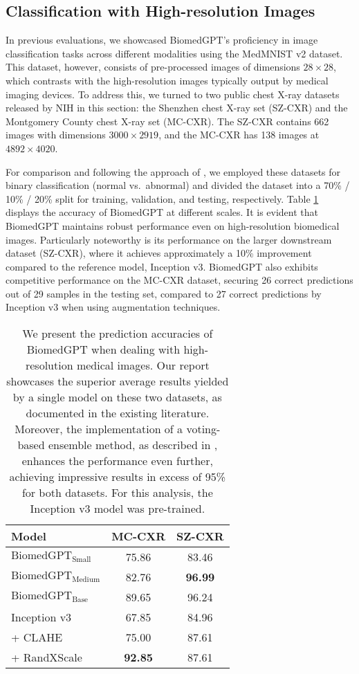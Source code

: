 \documentclass[10pt]{article} \usepackage[preprint]{tmlr}
\begin{document}
\subsection{Classification with High-resolution Images}
In previous evaluations, we showcased BiomedGPT's proficiency in image classification tasks across different modalities using the MedMNIST v2 dataset. This dataset, however, consists of pre-processed images of dimensions $28 \times 28$, which contrasts with the high-resolution images typically output by medical imaging devices. To address this, we turned to two public chest X-ray datasets released by NIH \citep{jaeger2014two} in this section: the Shenzhen chest X-ray set (SZ-CXR) and the Montgomery County chest X-ray set (MC-CXR). The SZ-CXR contains 662 images with dimensions $3000 \times 2919$, and the MC-CXR has 138 images at $4892 \times 4020$.

For comparison and following the approach of \citep{tasci2021voting}, we employed these datasets for binary classification (normal vs.\ abnormal) and divided the dataset into a 70\% / 10\% / 20\% split for training, validation, and testing, respectively. Table \ref{tab:high_resolution} displays the accuracy of BiomedGPT at different scales. It is evident that BiomedGPT maintains robust performance even on high-resolution biomedical images. Particularly noteworthy is its performance on the larger downstream dataset (SZ-CXR), where it achieves approximately a 10\% improvement compared to the reference model, Inception v3. BiomedGPT also exhibits competitive performance on the MC-CXR dataset, securing 26 correct predictions out of 29 samples in the testing set, compared to 27 correct predictions by Inception v3 when using augmentation techniques.

\begin{table}[htbp]
\centering
\caption{We present the prediction accuracies of BiomedGPT when dealing with high-resolution medical images. Our report showcases the superior average results yielded by a single model on these two datasets, as documented in the existing literature. Moreover, the implementation of a voting-based ensemble method, as described in \citep{tasci2021voting}, enhances the performance even further, achieving impressive results in excess of 95\% for both datasets. For this analysis, the Inception v3 model was pre-trained.}\label{tab:high_resolution} 
\begin{tabular}{lcc}
\toprule
Model & MC-CXR & SZ-CXR \\ \midrule
$\text{BiomedGPT}_{\text{Small}}$ & 75.86 & 83.46 \\
$\text{BiomedGPT}_{\text{Medium}}$ & 82.76 & \textbf{96.99} \\
$\text{BiomedGPT}_{\text{Base}}$ & 89.65 & 96.24 \\
Inception v3 \citep{szegedy2016rethinking} & 67.85 & 84.96 \\
{    } + CLAHE~\citep{pizer1986psychovisual, pizer1987adaptive} & 75.00 & 87.61 \\
{    } + RandXScale & \textbf{92.85} & 87.61 \\ \bottomrule
\end{tabular}
\end{table}
\end{document}
